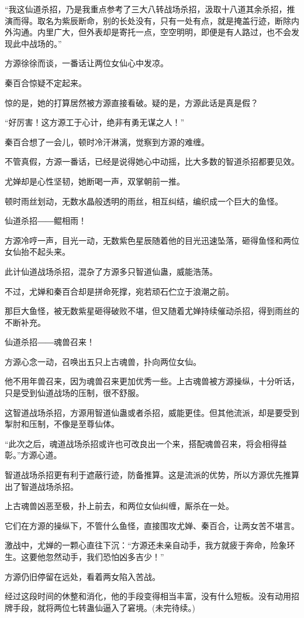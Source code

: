 \begin{this_body}
“我这仙道杀招，乃是我重点参考了三大八转战场杀招，汲取十八道其余杀招，推演而得。取名为紫辰断命，别的长处没有，只有一处有点，就是掩盖行迹，断除内外沟通。内里广大，但外表却是寄托一点，空空明明，即便是有人路过，也不会发现此中战场的。”

方源徐徐而谈，一番话让两位女仙心中发凉。

秦百合惊疑不定起来。

惊的是，她的打算居然被方源直接看破。疑的是，方源此话是真是假？

“好厉害！这方源工于心计，绝非有勇无谋之人！”

秦百合想了一会儿，顿时冷汗淋漓，觉察到方源的难缠。

不管真假，方源一番话，已经是说得她心中动摇，比大多数的智道杀招都要见效。

尤婵却是心性坚韧，她断喝一声，双掌朝前一推。

顿时雨丝划动，无数水晶般透明的雨丝，相互纠结，编织成一个巨大的鱼怪。

仙道杀招――鲲相雨！

方源冷哼一声，目光一动，无数紫色星辰随着他的目光迅速坠落，砸得鱼怪和两位女仙抬不起头来。

此计仙道战场杀招，混杂了方源多只智道仙蛊，威能浩荡。

不过，尤婵和秦百合却是拼命死撑，宛若顽石伫立于浪潮之前。

那巨大鱼怪，被无数紫星砸得破败不堪，但又随着尤婵持续催动杀招，得到雨丝的不断补充。

仙道杀招――魂兽召来！

方源心念一动，召唤出五只上古魂兽，扑向两位女仙。

他不用年兽召来，因为魂兽召来更加优秀一些。上古魂兽被方源操纵，十分听话，只是受到仙道战场的压制，很不舒服。

这智道战场杀招，方源用智道仙蛊或者杀招，威能更佳。但其他流派，却是要受到掣肘和压制，不像是至尊仙体。

“此次之后，魂道战场杀招或许也可改良出一个来，搭配魂兽召来，将会相得益彰。”方源心道。

智道战场杀招更有利于遮蔽行迹，防备推算。这是流派的优势，所以方源优先推算出了智道战场杀招。

上古魂兽凶恶至极，扑上前去，和两位女仙纠缠，厮杀在一处。

它们在方源的操纵下，不管什么鱼怪，直接围攻尤婵、秦百合，让两女苦不堪言。

激战中，尤婵的一颗心直往下沉：“方源还未亲自动手，我方就疲于奔命，险象环生。这要他忽然动手，我们恐怕凶多吉少！”

方源仍旧停留在远处，看着两女陷入苦战。

经过这段时间的休整和消化，他的手段变得相当丰富，没有什么短板。没有动用招牌手段，就将两位七转蛊仙逼入了窘境。(未完待续。)

\end{this_body}

